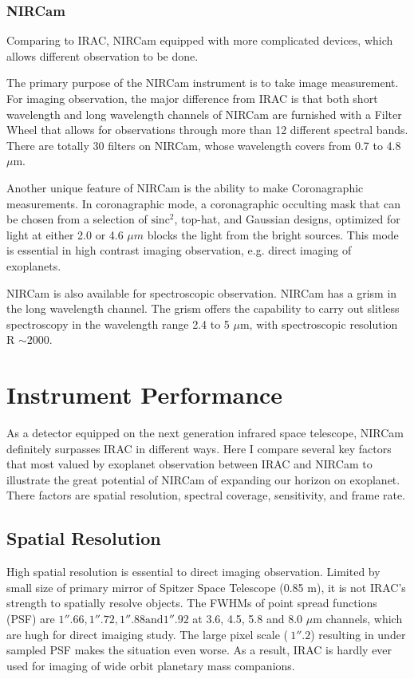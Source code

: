 \documentclass[preprint, 12pt]{aastex} \synctex=1
\begin{document}
\subsubsection{NIRCam} Comparing to IRAC, NIRCam equipped with 
more complicated devices, which allows different observation to be
done. 

The primary purpose of the NIRCam instrument is to take image
measurement. For imaging observation, the major difference from IRAC
is that both short wavelength and long wavelength channels of NIRCam are furnished
with a Filter Wheel that allows for observations through more than 12
different spectral bands. There are totally 30 filters on NIRCam,
whose wavelength covers from 0.7 to 4.8 $\mu$m.

Another unique feature of NIRCam is the ability to make Coronagraphic
measurements. In coronagraphic mode, a coronagraphic occulting mask
that can be chosen from a selection of $\mathrm{sinc}^{2}$, top-hat,
and Gaussian designs, optimized for light at either 2.0 or 4.6 $\mu m$
blocks the light from the bright sources. This mode is essential in
high contrast imaging observation, e.g. direct imaging of exoplanets.

NIRCam is also available for spectroscopic observation. NIRCam has a
grism in the long wavelength channel. The grism offers the capability
to carry out slitless spectroscopy in the wavelength range 2.4 to 5
$\mu$m, with spectroscopic resolution R $\sim 2000$.


\section{Instrument Performance}
\label{sec:performance} As a detector equipped on the next generation
infrared space telescope, NIRCam definitely surpasses IRAC in
different ways. Here I compare several key factors that most valued by
exoplanet observation between IRAC and NIRCam to illustrate the great
potential of NIRCam of expanding our horizon on exoplanet. There
factors are spatial resolution, spectral coverage, sensitivity, and
frame rate.\par

\subsection{Spatial Resolution} High spatial resolution is essential
to direct imaging observation. Limited by small size of primary mirror of
Spitzer Space Telescope (0.85 m), it is not IRAC's strength to
spatially resolve objects. The FWHMs of point spread functions (PSF) are
$1''.66, 1''.72, 1''.88 \mbox{and} 1''.92$ at 3.6, 4.5, 5.8 and 8.0
$\mu$m channels, which are hugh for direct imaiging study. The large
pixel scale ($~1''.2$) resulting in under sampled PSF makes the
situation even worse. As a result, IRAC is hardly ever used for
imaging of wide orbit planetary mass companions.\par
\end{document}
